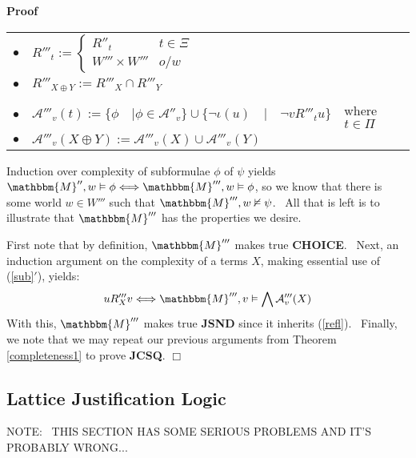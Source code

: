\documentclass{acmconf}
\newcommand{\assign}{:=}
\newcommand{\tmtextbf}[1]{{\bfseries{#1}}}
\newenvironment{proof}{\noindent\textbf{Proof\ }}{\hspace*{\fill}$\Box$\medskip}
\begin{document}
\begin{proof}
  \begin{center}
    \begin{tabular}{lll}
      $\bullet$ & $R'''_t \assign \left\{ \begin{array}{ll}
        R''_t & t \in \Xi\\
        W''' \times W''' & o / w
      \end{array} \right.$ & \\
      $\bullet$ & $R'''_{X \oplus Y} \assign R'''_X \cap R'''_Y$ & \\
      &  & \\
      $\bullet$ & $\mathcal{A}'''_v (t) \assign \{\phi \hspace{1em} | \phi \in
      \mathcal{A}''_v \} \cup \{\neg \iota (u) \hspace{1em} | \hspace{1em}
      \neg v R'''_t u\}$ & where $t \in \Pi$\\
      $\bullet$ & $\mathcal{A}'''_v (X \oplus Y) \assign \mathcal{A}'''_v (X)
      \cup \mathcal{A}'''_v (Y)$ & 
    \end{tabular}
  \end{center}
  
  
  
  
  
  Induction over complexity of subformulae $\phi$ of $\psi$ yields
  $\mathbbm{M}'', w \vDash \phi \Longleftrightarrow \mathbbm{M}''', w \vDash
  \phi$, so we know that there is some world $w \in W'''$ such that
  $\mathbbm{M}''', w \nvDash \psi$. \ All that is left is to illustrate that
  $\mathbbm{M}'''$ has the properties we desire.
  
  
  
  First note that by definition, $\mathbbm{M}'''$ makes true
  \tmtextbf{CHOICE}. \ Next, an induction argument on the complexity of a
  terms $X$, making essential use of (\ref{sub}$'$), yields:
  \[ u R_X''' v \Longleftrightarrow \mathbbm{M}''', v \vDash \bigwedge
     \mathcal{A}'''_v (X) \]
  With this, $\mathbbm{M}'''$ makes true \tmtextbf{JSND} since it inherits
  (\ref{refl}). \ Finally, we note that we may repeat our previous arguments
  from Theorem \ref{completeness1} to prove \tmtextbf{JCSQ}.
\end{proof}

\subsection{Lattice Justification Logic}

{\color{red} NOTE: \ THIS SECTION HAS SOME SERIOUS PROBLEMS AND IT'S PROBABLY
WRONG...}
\end{document}
